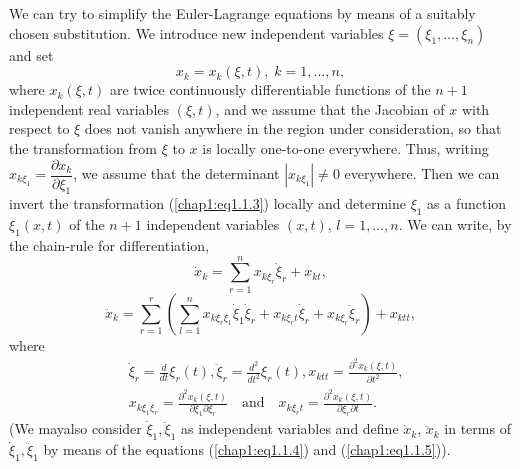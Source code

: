 We can try to simplify the Euler-Lagrange equations by means of a suitably chosen substitution. We introduce new independent variables $\xi = (\xi_1, \ldots, \xi_n)$ and set
\begin{equation*}
x_k = x_k (\xi, t), \; k = 1, \ldots, n, \tag{1.1.3}\label{chap1:eq1.1.3}
\end{equation*}
where $x_k(\xi, t)$ are twice continuously differentiable functions of the $n+1$ independent real variables $(\xi, t)$, and we assume that the Jacobian of $x$ with respect to $\xi$ does not vanish anywhere in the region under consideration, so that the transformation from $\xi$ to $x$ is locally one-to-one everywhere. Thus, writing $x_{k \xi_1} = \dfrac{\partial x_k}{\partial \xi_1}$, we assume that the determinant $|x_{k \xi_1}| \neq 0$ everywhere. Then we can invert the transformation (\ref{chap1:eq1.1.3}) locally and determine $\xi_1$ as a function $\xi_1 (x,t)$ of the $n+1$ independent variables $(x,t)$, $l=1, \ldots, n$. We can write, by the chain-rule for differentiation,
\begin{equation*}
\dot{x}_k = \sum\limits^{n}_{r=1} x_{k\xi_r} \dot{\xi}_r+ x_{kt}, \tag{1.1.4}\label{chap1:eq1.1.4}
\end{equation*}
\begin{equation*}
\ddot{x}_k = \sum\limits^r_{r=1} \left(\sum\limits^n_{l=1} x_{k \xi_r \xi_1} \dot{\xi}_1 \dot{\xi}_r + x_{k \xi_r t} \dot{\xi}_r + x_{k \xi_r} \ddot{\xi}_r  \right) + x_{ktt}, \tag{1.1.5} \label{chap1:eq1.1.5}
\end{equation*}
where 
\begin{align*}
& \dot{\xi}_r = \frac{d}{dt} \xi_r (t), \ddot{\xi}_r = \frac{d^2}{dt^2} \xi_r (t) , x_{ktt} = \frac{\partial^2 x_k(\xi, t)}{\partial t^2},\\
& x_{k \xi_1 \xi_r} = \frac{\partial^2 x_k(\xi, t)}{\partial \xi_1 \partial \xi_r} \quad \text{and} \quad  x_{k \xi_r t} = \frac{\partial^2 x_k(\xi, t)}{\partial \xi_r \partial t}. 
\end{align*}
(We may\pageoriginale also consider $\dot{\xi}_1, \ddot{\xi}_1$ as independent variables and define $\dot{x}_k$, $\ddot{x}_k$ in terms of $\dot{\xi}_1, \ddot{\xi}_1$ by means of the  equations (\ref{chap1:eq1.1.4}) and (\ref{chap1:eq1.1.5})). 

